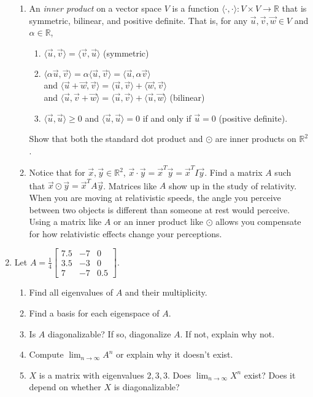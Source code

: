 \documentclass[letter]{article}
\newcommand{\R}{\mathbb{R}}
\newcommand{\mat}[1]{\begin{bmatrix}#1\end{bmatrix}}
\begin{document}
\begin{enumerate}
\begin{enumerate}
				\item  An \emph{inner product} on a vector space $V$ is a function $\langle \cdot,\cdot\rangle:V\times V\to\R$
					that is symmetric, bilinear, and positive definite.  That is, for any $\vec u,\vec v,\vec w\in V$
					and $\alpha\in\R$,
					\begin{enumerate}
						\item $\langle \vec u,\vec v\rangle =\langle \vec v,\vec u\rangle$ (symmetric)
						\item $\langle \alpha\vec u,\vec v\rangle =\alpha\langle \vec u,\vec v\rangle =\langle \vec u,\alpha\vec v\rangle$\\
							and $\langle \vec u+\vec w,\vec v\rangle =\langle \vec u,\vec v\rangle+\langle \vec w,\vec v\rangle$\\
							and $\langle \vec u,\vec v+\vec w\rangle =\langle \vec u,\vec v\rangle+\langle \vec u,\vec w\rangle$ (bilinear)
						\item $\langle \vec u,\vec u\rangle\geq 0$ and $\langle \vec u,\vec u\rangle=0$ if and only if $\vec u=0$ (positive definite).
					\end{enumerate}

					Show that both the standard dot product and $\odot$ are inner products on $\R^2$.
				\item Notice that for $\vec x,\vec y\in\R^2$, $\vec x\cdot\vec y = \vec x^T\vec y=\vec x^TI\vec y$.
					Find a matrix $A$ such that $\vec x\odot \vec y=\vec x^TA\vec y$.  Matrices like $A$ 
					show up in the study of relativity.  When you are moving at relativistic speeds, the angle
					you perceive between two objects is different than someone at rest would perceive.  Using
					a matrix like $A$ or an inner product like $\odot$ allows you compensate for how relativistic
					effects change your perceptions.
			\end{enumerate}

		\item Let $A=\tfrac{1}{4}\mat{7.5&-7&0\\3.5&-3&0\\7&-7&0.5}$.
		\begin{enumerate}
			\item Find all eigenvalues of $A$ and their multiplicity.
			\item Find a basis for each eigenspace of $A$.
			\item Is $A$ diagonalizable?  If so, diagonalize $A$.  If not, explain why
				not.
			\item Compute $\lim_{n\to\infty} A^n$ or explain why it doesn't exist.  
			\item $X$ is a matrix with eigenvalues $2,3,3$.  Does $\lim_{n\to\infty} X^n$ exist?
				Does it depend on whether $X$ is diagonalizable?
		\end{enumerate}
		

\end{enumerate}
\end{document}
